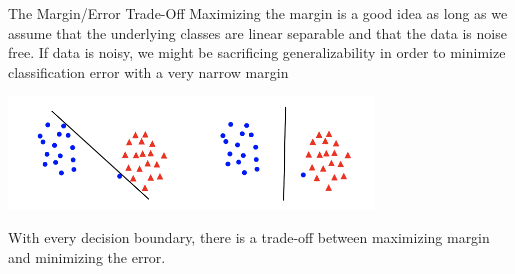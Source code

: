\documentclass[12pt,t]{beamer}
\begin{document}
\begin{frame}{The Margin/Error Trade-Off} 
\vskip-0.4cm
Maximizing the margin is a good idea as long as we assume that the underlying classes are linear separable and that the data is noise free. 
\vskip0.2cm
If data is noisy, we might be sacrificing generalizability in order to minimize classification error with a very narrow margin 
\begin{center}
\includegraphics[height=30mm]{lecture18_g8}\includegraphics[height=30mm]{lecture18_g9}
\end{center}
With every decision boundary, there is a trade-off between maximizing margin and minimizing the error.
\end{frame}
\end{document}
